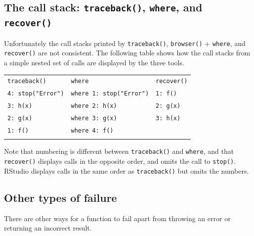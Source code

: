 \subsection{The call stack: \texttt{traceback()}, \texttt{where}, and
\texttt{recover()}}

Unfortunately the call stacks printed by \texttt{traceback()},
\texttt{browser()} + \texttt{where}, and \texttt{recover()} are not
consistent. The following table shows how the call stacks from a simple
nested set of calls are displayed by the three tools. 

\begin{longtable}[c]{@{}lll@{}}
\toprule\addlinespace
\texttt{traceback()} & \texttt{where} & \texttt{recover()}
\\\addlinespace
\midrule\endhead
\texttt{4: stop("Error")} & \texttt{where 1: stop("Error")} &
\texttt{1: f()}
\\\addlinespace
\texttt{3: h(x)} & \texttt{where 2: h(x)} & \texttt{2: g(x)}
\\\addlinespace
\texttt{2: g(x)} & \texttt{where 3: g(x)} & \texttt{3: h(x)}
\\\addlinespace
\texttt{1: f()} & \texttt{where 4: f()} &
\\\addlinespace
\bottomrule
\end{longtable}

Note that numbering is different between \texttt{traceback()} and
\texttt{where}, and that \texttt{recover()} displays calls in the
opposite order, and omits the call to \texttt{stop()}. RStudio displays
calls in the same order as \texttt{traceback()} but omits the numbers.

\subsection{Other types of failure}

There are other ways for a function to fail apart from throwing an error
or returning an incorrect result.

